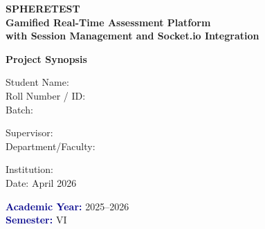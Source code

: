 \documentclass[12pt,a4paper]{report}
\begin{document}
\frontmatter


\begin{titlepage}
  \begin{center}
    \vspace*{1.5cm}
    {\color{titleblue}\Large\bfseries\sffamily
      SPHERETEST \\[0.5cm]
      Gamified Real-Time Assessment Platform\\[0.3cm]
      with Session Management and Socket.io Integration
    }
    \vspace{3cm}
    
    {\Large\bfseries\sffamily Project Synopsis}
    \vspace{3.5cm}
    
    {\normalsize\sffamily
      Student Name: \underline{\hspace{7cm}} \\[0.8cm]
      Roll Number / ID: \underline{\hspace{7cm}} \\[0.8cm]
      Batch: \underline{\hspace{7cm}} \\[0.8cm]
    }
    \vspace{2.5cm}
    
    {\normalsize\sffamily
      Supervisor: \underline{\hspace{7cm}} \\[0.8cm]
      Department/Faculty: \underline{\hspace{7cm}} \\[0.8cm]
    }
    \vspace{2.5cm}
    
    {\normalsize\sffamily
      Institution: \underline{\hspace{7cm}} \\[0.5cm]
      Date: April 2026
    }
    \vfill
    
    {\small\sffamily
      \textcolor{darkblue}{\textbf{Academic Year:}} 2025--2026 \\
      \textcolor{darkblue}{\textbf{Semester:}} VI
    }
  \end{center}
\end{titlepage}

\cleardoublepage

\end{document}
